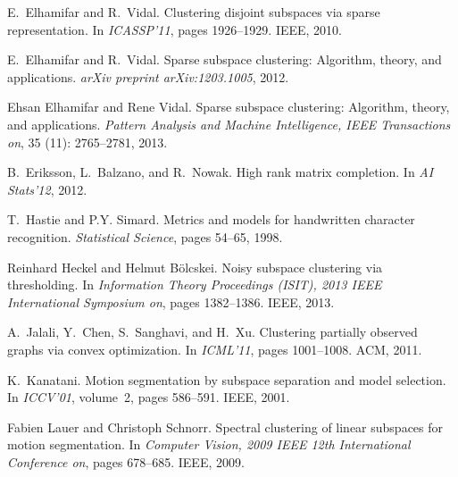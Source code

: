 \documentclass{ctexart}
\begin{document}
\begin{thebibliography}{47}
    E.~Elhamifar and R.~Vidal.
    \newblock Clustering disjoint subspaces via sparse representation.
    \newblock In \emph{ICASSP'11}, pages 1926--1929. IEEE, 2010.

    E.~Elhamifar and R.~Vidal.
    \newblock Sparse subspace clustering: Algorithm, theory, and applications.
    \newblock \emph{arXiv preprint arXiv:1203.1005}, 2012.

    Ehsan Elhamifar and Rene Vidal.
    \newblock Sparse subspace clustering: Algorithm, theory, and applications.
    \newblock \emph{Pattern Analysis and Machine Intelligence, IEEE Transactions
    on}, 35 (11): 2765--2781, 2013.

    B.~Eriksson, L.~Balzano, and R.~Nowak.
    \newblock High rank matrix completion.
    \newblock In \emph{AI Stats'12}, 2012.

    T.~Hastie and P.Y. Simard.
    \newblock Metrics and models for handwritten character recognition.
    \newblock \emph{Statistical Science}, pages 54--65, 1998.

    Reinhard Heckel and Helmut B{\"o}lcskei.
    \newblock Noisy subspace clustering via thresholding.
    \newblock In \emph{Information Theory Proceedings (ISIT), 2013 IEEE
    International Symposium on}, pages 1382--1386. IEEE, 2013.

    A.~Jalali, Y.~Chen, S.~Sanghavi, and H.~Xu.
    \newblock Clustering partially observed graphs via convex optimization.
    \newblock In \emph{ICML'11}, pages 1001--1008. ACM, 2011.

    K.~Kanatani.
    \newblock Motion segmentation by subspace separation and model selection.
    \newblock In \emph{ICCV'01}, volume~2, pages 586--591. IEEE, 2001.

    Fabien Lauer and Christoph Schnorr.
    \newblock Spectral clustering of linear subspaces for motion segmentation.
    \newblock In \emph{Computer Vision, 2009 IEEE 12th International Conference
    on}, pages 678--685. IEEE, 2009.


\end{thebibliography}
\end{document}
